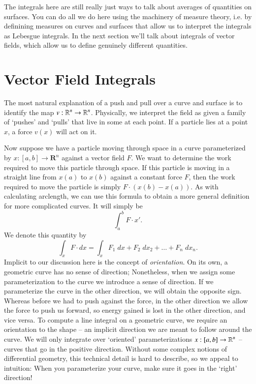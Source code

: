The integrals here are still really just ways to talk about averages of quantities on surfaces. You can do all we do here using the machinery of measure theory, i.e. by definining measures on curves and surfaces that allow us to interpret the integrals as Lebesgue integrals. In the next section we'll talk about integrals of vector fields, which allow us to define genuinely different quantities.

\section{Vector Field Integrals}

The most natural explanation of a push and pull over a curve and surface is to identify the map $v: \operatorname{\mathbb{R}}^n \to \operatorname{\mathbb{R}}^n$. Physically, we interpret the field as given a family of `pushes' and `pulls' that live in some at each point. If a particle lies at a point $x$, a force $v(x)$ will act on it.

Now suppose we have a particle moving through space in a curve parameterized by $x:[a,b] \to \mathbf{R}^n$ against a vector field $F$. We want to determine the work required to move this particle through space. If this particle is moving in a straight line from $x(a)$ to $x(b)$ against a constant force $F$, then the work required to move the particle is simply $F \cdot (x(b) - x(a))$. As with calculating arclength, we can use this formula to obtain a more general definition for more complicated curves. It will simply be
%
\[ \int_a^b F \cdot x'. \]
%
We denote this quantity by
%
\[ \int_x F \cdot dx = \int_x F_1\; dx + F_2\; dx_2 + \dots + F_n\; dx_n. \]
%
Implicit to our discussion here is the concept of \emph{orientation}. On its own, a geometric curve has no sense of direction; Nonetheless, when we assign some parameterization to the curve we introduce a sense of direction. If we parameterize the curve in the other direction, we will obtain the opposite sign. Whereas before we had to push against the force, in the other direction we allow the force to push us forward, so energy gained is lost in the other direction, and vice versa. To compute a line integral on a geometric curve, we require an orientation to the shape -- an implicit direction we are meant to follow around the curve. We will only integrate over `oriented' parameterizations $x:[a,b] \to \operatorname{\mathbb{R}}^n$ -- curves that go in the positive direction. Without some complex notions of differential geometry, this technical detail is hard to describe, so we appeal to intuition: When you parameterize your curve, make sure it goes in the `right' direction!

